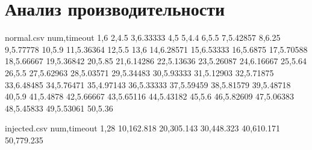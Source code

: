 \section{Анализ производительности}

\begin{filecontents*}{normal.csv}
	num,timeout
	1,6
	2,4.5
	3,6.33333
	4,5
	5,4.4
	6,5.5
	7,5.42857
	8,6.25
	9,5.77778
	10,5.9
	11,5.36364
	12,5.5
	13,6
	14,6.28571
	15,6.53333
	16,5.6875
	17,5.70588
	18,5.66667
	19,5.36842
	20,5.85
	21,6.14286
	22,5.13636
	23,5.26087
	24,6.16667
	25,5.64
	26,5.5
	27,5.62963
	28,5.03571
	29,5.34483
	30,5.93333
	31,5.12903
	32,5.71875
	33,6.48485
	34,5.76471
	35,4.97143
	36,5.33333
	37,5.59459
	38,5.81579
	39,5.48718
	40,5.9
	41,5.4878
	42,5.66667
	43,5.65116
	44,5.43182
	45,5.6
	46,5.82609
	47,5.06383
	48,5.45833
	49,5.53061
	50,5.36
\end{filecontents*}

\begin{filecontents*}{injected.csv}
	num,timeout
	1,28
	10,162.818
	20,305.143
	30,448.323
	40,610.171
	50,779.235
\end{filecontents*}


